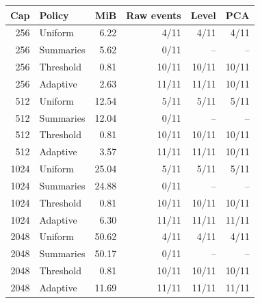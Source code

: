 \begin{tabular}{rlrrrr}
\toprule
Cap & Policy & MiB & Raw events & Level & PCA \\
\midrule
256 & Uniform & 6.22 & 4/11 & 4/11 & 4/11 \\
256 & Summaries & 5.62 & 0/11 & -- & -- \\
256 & Threshold & 0.81 & 10/11 & 10/11 & 10/11 \\
256 & Adaptive & 2.63 & 11/11 & 11/11 & 10/11 \\
512 & Uniform & 12.54 & 5/11 & 5/11 & 5/11 \\
512 & Summaries & 12.04 & 0/11 & -- & -- \\
512 & Threshold & 0.81 & 10/11 & 10/11 & 10/11 \\
512 & Adaptive & 3.57 & 11/11 & 11/11 & 10/11 \\
1024 & Uniform & 25.04 & 5/11 & 5/11 & 5/11 \\
1024 & Summaries & 24.88 & 0/11 & -- & -- \\
1024 & Threshold & 0.81 & 10/11 & 10/11 & 10/11 \\
1024 & Adaptive & 6.30 & 11/11 & 11/11 & 11/11 \\
2048 & Uniform & 50.62 & 4/11 & 4/11 & 4/11 \\
2048 & Summaries & 50.17 & 0/11 & -- & -- \\
2048 & Threshold & 0.81 & 10/11 & 10/11 & 10/11 \\
2048 & Adaptive & 11.69 & 11/11 & 11/11 & 11/11 \\
\bottomrule
\end{tabular}
